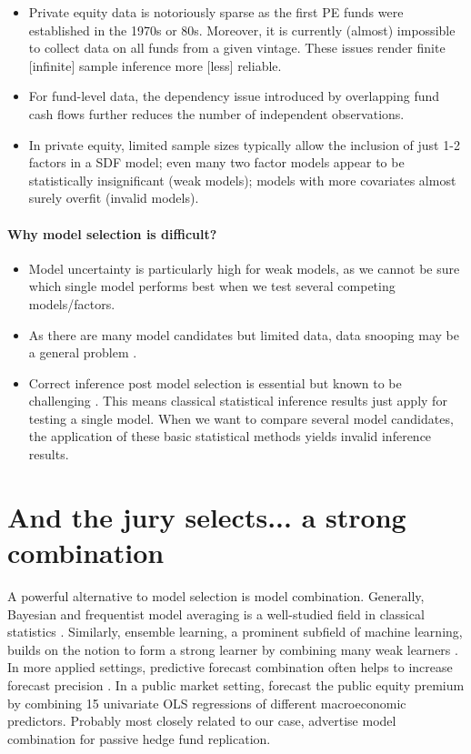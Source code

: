 \documentclass[12pt]{article}
\begin{document}
\begin{itemize}
	\item Private equity data is notoriously sparse as the first PE funds were established in the 1970s or 80s. Moreover, it is currently (almost) impossible to collect data on all funds from a given vintage. These issues render finite [infinite] sample inference more [less] reliable.
	\item For fund-level data, the dependency issue introduced by overlapping fund cash flows further reduces the number of independent observations.
	\item In private equity, limited sample sizes typically allow the inclusion of just 1-2 factors in a SDF model; even many two factor models appear to be statistically insignificant (weak models); models with more covariates almost surely overfit (invalid models).
\end{itemize}

\paragraph{Why model selection is difficult?}

\begin{itemize}
	\item Model uncertainty is particularly high for weak models, as we cannot be sure which single model performs best when we test several competing models/factors.
	\item As there are many model candidates but limited data, data snooping may be a general problem \citep{W00}. 
	\item Correct inference post model selection is essential but known to be challenging \citep{BLP19}. This means classical statistical inference results just apply for testing a single model. When we want to compare several model candidates, the application of these basic statistical methods yields invalid inference results.
\end{itemize}



\section{And the jury selects... a strong combination}
\label{sec:model_combination}

A powerful alternative to model selection is model combination.
Generally, Bayesian and frequentist model averaging is a well-studied field in classical statistics \citep{H14,M15}.
Similarly, ensemble learning, a prominent subfield of machine learning, builds on the notion to form a strong learner by combining many weak learners \citep{B12}.
In more applied settings, predictive forecast combination often helps to increase forecast precision \citep{HL10}.
In a public market setting, \cite{RSZ10} forecast the public equity premium by combining 15 univariate OLS regressions of different macroeconomic predictors.
Probably most closely related to our case, \cite{OST17} advertise model combination for passive hedge fund replication.
\end{document}
